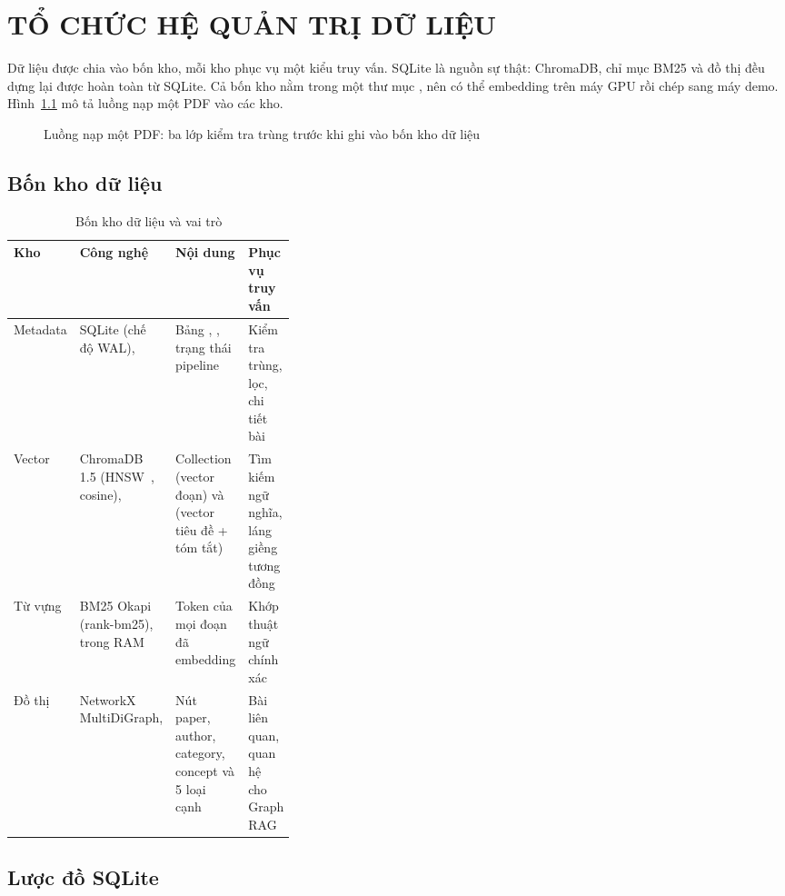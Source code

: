 \chapter{TỔ CHỨC HỆ QUẢN TRỊ DỮ LIỆU}\label{chap:tochuc}

Dữ liệu được chia vào bốn kho, mỗi kho phục vụ một kiểu truy vấn. SQLite là nguồn sự thật: ChromaDB, chỉ mục BM25
và đồ thị đều dựng lại được hoàn toàn từ SQLite. Cả bốn kho nằm trong một thư mục , nên có thể
embedding trên máy GPU rồi chép sang máy demo. Hình~\ref{fig:napdulieu} mô tả luồng nạp một PDF vào các kho.

\begin{figure}[H]
\centering

\caption{Luồng nạp một PDF: ba lớp kiểm tra trùng trước khi ghi vào bốn kho dữ liệu}\label{fig:napdulieu}
\end{figure}

\section{Bốn kho dữ liệu}

\begin{table}[H]
\centering\small{}
\begin{tabularx}{\linewidth}{@{}P{0.12\linewidth}P{0.24\linewidth}LL@{}}
\toprule
\textbf{Kho} & \textbf{Công nghệ} & \textbf{Nội dung} & \textbf{Phục vụ truy vấn}\\
\midrule
Metadata & SQLite (chế độ WAL),  & Bảng , , trạng thái pipeline & Kiểm tra trùng, lọc, chi tiết bài\\
Vector & ChromaDB 1.5 (HNSW~\cite{hnsw}, cosine),  & Collection  (vector đoạn) và  (vector tiêu đề + tóm tắt) & Tìm kiếm ngữ nghĩa, láng giềng tương đồng\\
Từ vựng & BM25 Okapi~\cite{bm25} (rank-bm25), trong RAM & Token của mọi đoạn đã embedding & Khớp thuật ngữ chính xác\\
Đồ thị & NetworkX~\cite{networkx} MultiDiGraph,  & Nút paper, author, category, concept và 5 loại cạnh & Bài liên quan, quan hệ cho Graph RAG\\
\bottomrule
\end{tabularx}
\caption{Bốn kho dữ liệu và vai trò}\label{tab:kho}
\end{table}

\section{Lược đồ SQLite}

